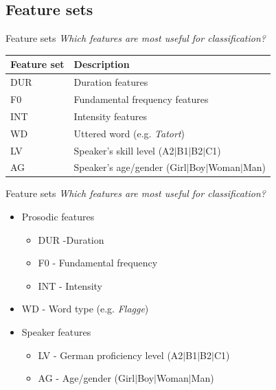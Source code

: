 \documentclass[xcolor={dvipsnames}]{beamer}
\begin{document}
	\subsection{Feature sets}
		\begin{frame}{Feature sets}
		\textit{Which features are most useful for classification?}
		\vfill
		\begin{tabularx}{\textwidth}{lX}
			\toprule
			Feature set & Description \\
			\midrule
			DUR & Duration features \\
			F0 & Fundamental frequency features \\
			INT & Intensity features \\
			\midrule
			WD %
				& Uttered word (e.g. \textit{Tatort}) \\
			LV %
				& Speaker's skill level  (A2$|$B1$|$B2$|$C1)\\
			AG %
				& Speaker's age/gender  (Girl$|$Boy$|$Woman$|$Man)\\
			\bottomrule
			\end{tabularx}		
		\end{frame}
		
		\begin{frame}{Feature sets}
		\textit{Which features are most useful for classification?}
		\vfill
		\begin{itemize}
		\item Prosodic features
			\begin{itemize}
			\item DUR -Duration
			\item F0 - Fundamental frequency
			\item INT - Intensity 
			\end{itemize}
		\item WD - Word type (e.g. \textit{Flagge})
		\item Speaker features
			\begin{itemize}
			\item LV - German proficiency level (A2$|$B1$|$B2$|$C1)
			\item AG - Age/gender (Girl$|$Boy$|$Woman$|$Man)
			\end{itemize}
		\end{itemize}
		\end{frame}
\end{document}
